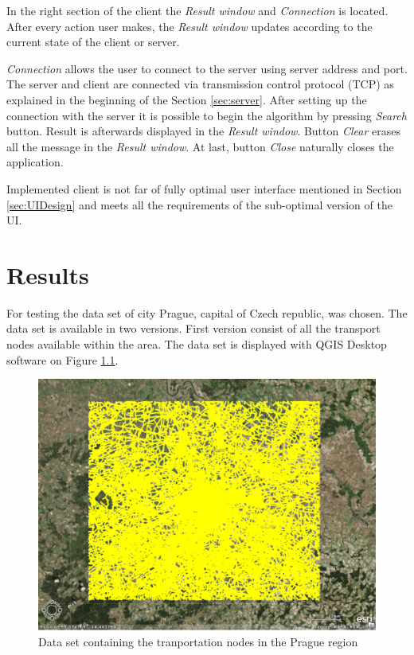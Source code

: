 \documentclass[thesis=M,english]{FITthesis}[2012/10/20]
\begin{document}
In the right section of the client the \textit{Result window} and \textit{Connection} is located. After every action user makes, the \textit{Result window} updates according to the current state of the client or server.

\textit{Connection} allows the user to connect to the server using server address and port. The server and client are connected via transmission control protocol (TCP) as explained in the beginning of the Section \ref{sec:server}. After setting up the connection with the server it is possible to begin the algorithm by pressing \textit{Search} button. Result is afterwards displayed in the \textit{Result window}. Button \textit{Clear} erases all the message in the \textit{Result window}. At last, button \textit{Close} naturally closes the application.


Implemented client is not far of fully optimal user interface mentioned in Section \ref{sec:UIDesign} and meets all the requirements of the sub-optimal version of the UI. 


\chapter{Results}
\label{ch:Results}

For testing the data set of city Prague, capital of Czech republic, was chosen. The data set is available in two versions. First version consist of all the transport nodes available within the area. 
The data set is displayed with QGIS Desktop software on Figure \ref{pic:dataset1}.
\begin{figure}[H]
\centering
\includegraphics[width=1\textwidth]{pics/praguedatasetL}
\caption{Data set containing the tranportation nodes in the Prague region}
\label{pic:dataset1}
\end{figure}
\end{document}
